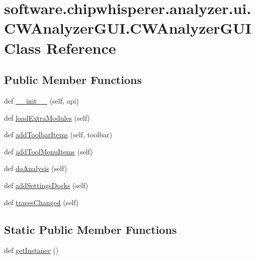 \hypertarget{classsoftware_1_1chipwhisperer_1_1analyzer_1_1ui_1_1CWAnalyzerGUI_1_1CWAnalyzerGUI}{}\section{software.\+chipwhisperer.\+analyzer.\+ui.\+C\+W\+Analyzer\+G\+U\+I.\+C\+W\+Analyzer\+G\+U\+I Class Reference}
\label{classsoftware_1_1chipwhisperer_1_1analyzer_1_1ui_1_1CWAnalyzerGUI_1_1CWAnalyzerGUI}
\subsection*{Public Member Functions}
\begin{DoxyCompactItemize}
\item 
def \hyperlink{classsoftware_1_1chipwhisperer_1_1analyzer_1_1ui_1_1CWAnalyzerGUI_1_1CWAnalyzerGUI_af8f2b11eb538bd1637d8aed43a9bcd54}{\+\_\+\+\_\+init\+\_\+\+\_\+} (self, api)
\item 
def \hyperlink{classsoftware_1_1chipwhisperer_1_1analyzer_1_1ui_1_1CWAnalyzerGUI_1_1CWAnalyzerGUI_a2c3240b86fb283e93b1643ae004edc79}{load\+Extra\+Modules} (self)
\item 
def \hyperlink{classsoftware_1_1chipwhisperer_1_1analyzer_1_1ui_1_1CWAnalyzerGUI_1_1CWAnalyzerGUI_ae2f05d6acdff9fd7cfac3a308cf17bf9}{add\+Toolbar\+Items} (self, toolbar)
\item 
def \hyperlink{classsoftware_1_1chipwhisperer_1_1analyzer_1_1ui_1_1CWAnalyzerGUI_1_1CWAnalyzerGUI_aedd0cc1a22191a60d93292f3ac9d8f0c}{add\+Tool\+Menu\+Items} (self)
\item 
def \hyperlink{classsoftware_1_1chipwhisperer_1_1analyzer_1_1ui_1_1CWAnalyzerGUI_1_1CWAnalyzerGUI_a56d903d82aa745021aed3c292f9aaad7}{do\+Analysis} (self)
\item 
def \hyperlink{classsoftware_1_1chipwhisperer_1_1analyzer_1_1ui_1_1CWAnalyzerGUI_1_1CWAnalyzerGUI_af69dfc1ee9e018319415933f9d0244f8}{add\+Settings\+Docks} (self)
\item 
def \hyperlink{classsoftware_1_1chipwhisperer_1_1analyzer_1_1ui_1_1CWAnalyzerGUI_1_1CWAnalyzerGUI_aaa69388e60ea3ce45a9fc5a078423a29}{traces\+Changed} (self)
\end{DoxyCompactItemize}
\subsection*{Static Public Member Functions}
\begin{DoxyCompactItemize}
\item 
def \hyperlink{classsoftware_1_1chipwhisperer_1_1analyzer_1_1ui_1_1CWAnalyzerGUI_1_1CWAnalyzerGUI_a02caf52ffb25c00ea5d0f822bddad1c5}{get\+Instance} ()
\end{DoxyCompactItemize}

